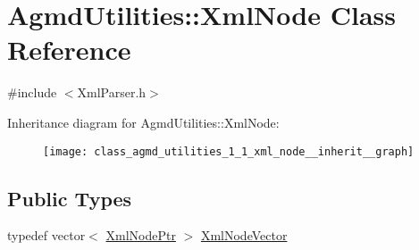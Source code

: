 \hypertarget{class_agmd_utilities_1_1_xml_node}{\section{Agmd\+Utilities\+:\+:Xml\+Node Class Reference}
\label{class_agmd_utilities_1_1_xml_node}
}


{\ttfamily \#include $<$Xml\+Parser.\+h$>$}



Inheritance diagram for Agmd\+Utilities\+:\+:Xml\+Node\+:\nopagebreak
\begin{figure}[H]
\begin{center}
\leavevmode
\texttt{[image: class\_agmd\_utilities\_1\_1\_xml\_node\_\_inherit\_\_graph]}
\end{center}
\end{figure}
\subsection*{Public Types}
\begin{DoxyCompactItemize}
\item 
typedef vector$<$ \hyperlink{namespace_agmd_utilities_a5c62c53e06995bf0eddd56b55f44e62e}{Xml\+Node\+Ptr} $>$ \hyperlink{class_agmd_utilities_1_1_xml_node_a732265394a08c9960b72f0678c0272b7}{Xml\+Node\+Vector}
\end{DoxyCompactItemize}
